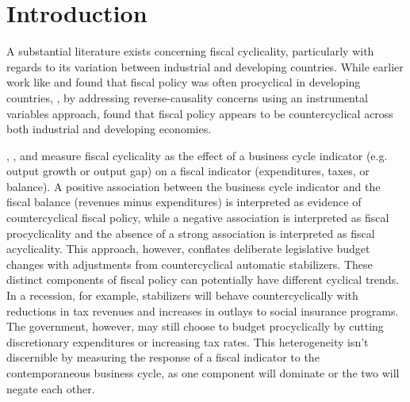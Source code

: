 \documentclass[12pt]{article}
\newcommand{\cn}[1]{\citeasnoun{#1}}
\begin{document}

\clearpage

\section{Introduction \label{Introduction}}

A substantial literature exists concerning fiscal cyclicality, particularly with regards to its variation between industrial and developing countries. While earlier work like \cn{gavin1997fiscal} and \cn{kaminsky2004when} found that fiscal policy was often procyclical in developing countries, \cn{jaimovich2007procyclicality}, by addressing reverse-causality concerns using an instrumental variables approach, found that fiscal policy appears to be countercyclical across both industrial and developing economies.

\cn{jaimovich2007procyclicality}, \cn{gavin1997fiscal}, and \cn{kaminsky2004when} measure fiscal cyclicality as the effect of a business cycle indicator (e.g. output growth or output gap) on a  fiscal indicator (expenditures, taxes, or balance). A positive association between the business cycle indicator and the fiscal balance (revenues minus expenditures) is interpreted as evidence of countercyclical fiscal policy, while a negative association is interpreted as fiscal procyclicality and the absence of a strong association is interpreted as fiscal acyclicality. This approach, however, conflates deliberate legislative budget changes with adjustments  from countercyclical automatic stabilizers. These distinct components of fiscal policy can potentially have different cyclical trends. In a recession, for example, stabilizers will behave countercyclically with reductions in tax revenues and increases in outlays to social insurance programs. The government, however, may still choose to budget procyclically by cutting discretionary expenditures or increasing tax rates. This heterogeneity isn't discernible by measuring the response of a fiscal indicator to the contemporaneous business cycle, as one component will dominate or the two will negate each other. 
\end{document}
